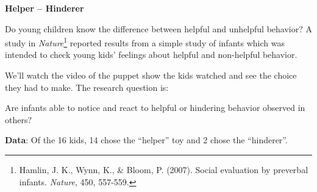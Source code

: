 
\def\theTopic{Helper--Hinderer }
\def\dayNum{4}


\begin{center}
\vspace*{-.2in}
{\bf {\large Helper -- Hinderer}}\\
\end{center}

Do young children know the difference between helpful and unhelpful
behavior?  A study in   {\it Nature}\footnote{ Hamlin, J. K.,
  Wynn, K., \& Bloom, P. (2007). Social evaluation by preverbal
  infants. {\it Nature}, 450, 557-559. }
reported results from a simple study of infants which was intended to
check young kids' feelings about helpful and non-helpful behavior.  

We'll watch the video of the puppet show the kids watched and see the
choice they had to make.  The research question is:
\begin{center}
  {\sf Are infants able to notice and react to helpful or hindering
    behavior observed in others?} 
\end{center}

{\bf Data}:  Of the 16 kids, 14 chose the ``helper'' toy and 2 chose
the ``hinderer''.

